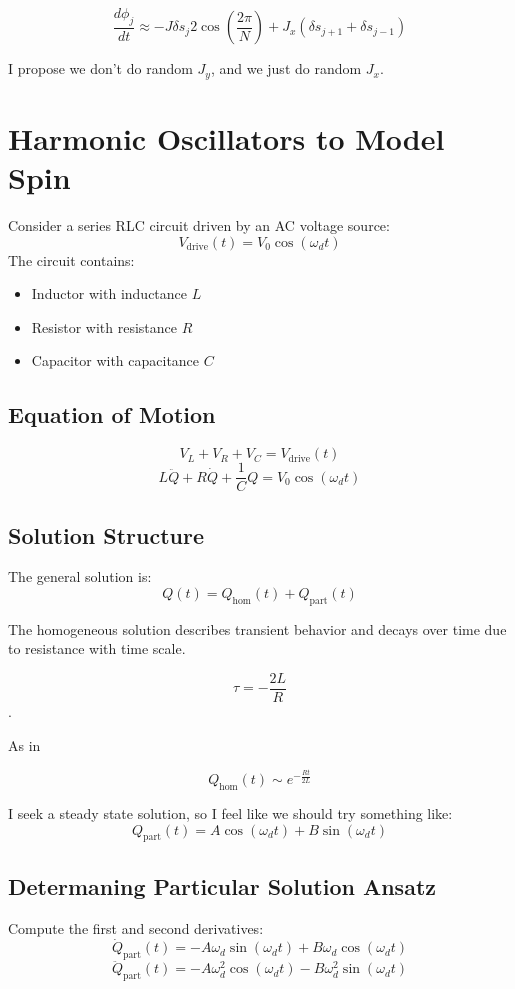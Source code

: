\documentclass{article}
\begin{document}
\[
    \boxed{\frac{d \phi_j}{dt} \approx -J\delta s_j2\cos(\frac{2\pi}{N}) + J_x(\delta s_{j+1} + \delta s_{j-1})}
\]

I propose we don't do random $J_y$, and we just do random $J_x$.

\section{Harmonic Oscillators to Model Spin}

Consider a series RLC circuit driven by an AC voltage source:
\[
V_{\text{drive}}(t) = V_0 \cos(\omega_d t)
\]
The circuit contains:
\begin{itemize}
  \item Inductor with inductance $L$
  \item Resistor with resistance $R$
  \item Capacitor with capacitance $C$
\end{itemize}

\subsection{Equation of Motion}
\[
V_L + V_R + V_C = V_{\text{drive}}(t)
\]
\[
\boxed{L \ddot{Q} + R \dot{Q} + \frac{1}{C} Q = V_0 \cos(\omega_d t)}
\]

\subsection{Solution Structure}

The general solution is:
\[
Q(t) = Q_{\text{hom}}(t) + Q_{\text{part}}(t)
\]

The homogeneous solution describes transient behavior and decays over time due to resistance with time scale.

\[\tau = -\frac{2L}{R}\].

As in 

\[Q_{\text{hom}}(t) \sim e^{-\frac{Rt}{2L}}\]

I seek a steady state solution, so I feel like we should try something like:
\[
Q_{\text{part}}(t) = A \cos(\omega_d t) + B \sin(\omega_d t)
\]

\subsection{Determaning Particular Solution Ansatz}
Compute the first and second derivatives:
\[
\dot{Q}_{\text{part}}(t) = -A \omega_d \sin(\omega_d t) + B \omega_d \cos(\omega_d t)
\]
\[
\ddot{Q}_{\text{part}}(t) = -A \omega_d^2 \cos(\omega_d t) - B \omega_d^2 \sin(\omega_d t)
\]
\end{document}
